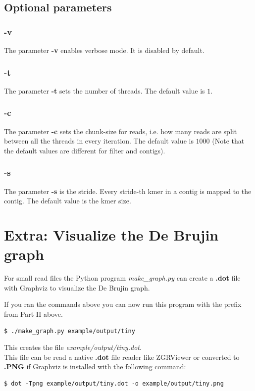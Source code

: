 \documentclass[a4paper]{report}
\renewcommand{\b}[1]{\textbf{#1}}  %
\newcommand{\e}[1]{\emph{#1}}    %
\begin{document}
\subsection{Optional parameters}

\subsubsection{\b{-v}}
The parameter \b{-v} enables verbose mode. It is disabled by default.
\subsubsection{\b{-t}}
The parameter \b{-t} sets the number of threads. The default value is $1$.
\subsubsection{\b{-c}}
The parameter \b{-c} sets the chunk-size for reads, i.e. how many reads are split between all the threads in every iteration. 
The default value is $1000$ (Note that the default values are different for filter and contigs).
\subsubsection{\b{-s}}
The parameter \b{-s} is the stride. Every stride-th kmer in a contig is mapped to the contig. The default value is the kmer size. 
\section{Extra: Visualize the De Brujin graph}
For small read files the Python program \e{make\_graph.py} can create a \b{.dot} file with Graphviz\cite{graphviz} 
to visualize the De Brujin graph.

If you ran the commands above you can now run this program with the prefix from Part II above.
\begin{verbatim}
$ ./make_graph.py example/output/tiny
\end{verbatim}

This creates the file \e{example/output/tiny.dot}.\\[4pt]

This file can be read a native \b{.dot} file reader like ZGRViewer\cite{zgr} or converted to \b{.PNG} if Graphviz is installed with the following command:
\begin{verbatim}
$ dot -Tpng example/output/tiny.dot -o example/output/tiny.png
\end{verbatim}
\end{document}
